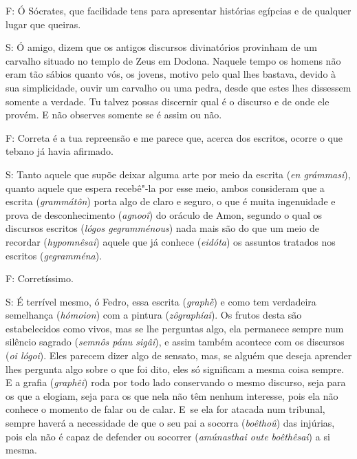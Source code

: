 F: Ó Sócrates, que facilidade tens para apresentar histórias egípcias e
de qualquer lugar que queiras.

 

S: Ó amigo, dizem que os antigos discursos divinatórios provinham de um
carvalho situado no templo de Zeus em Dodona. Naquele tempo os homens
não eram tão sábios quanto vós, os jovens, motivo pelo qual lhes
bastava, devido à sua simplicidade, ouvir um carvalho ou uma pedra,
desde que estes lhes dissessem somente a verdade. \bekker{[275c]} Tu talvez
possas discernir qual é o discurso e de onde ele provém. E não observes
somente se é assim ou não.

F: Correta é a tua repreensão e me parece que, acerca dos escritos,
ocorre o que tebano já havia afirmado.

 

S: Tanto aquele que supõe deixar alguma arte por meio da escrita
(\emph{en grámmasi}), quanto aquele que espera recebê"-la por esse meio,
ambos consideram que a escrita (\emph{grammátôn}) porta algo de claro e
seguro, o que é muita ingenuidade e prova de desconhecimento
(\emph{agnooî}) do oráculo de Amon, \bekker{[275d]} segundo o qual os
discursos escritos (\emph{lógos gegramménous}) nada mais são do que um
meio de recordar (\emph{hypomnêsai}) aquele que já conhece
(\emph{eidóta}) os assuntos tratados nos escritos
(\emph{gegramména}).

F: Corretíssimo.

 

S: É terrível mesmo, ó Fedro, essa escrita (\emph{graphḕ}) e como tem
verdadeira semelhança (\emph{hómoion}) com a pintura
(\emph{zôgraphíai}). Os frutos desta são estabelecidos como vivos, mas
se lhe perguntas algo, ela permanece sempre num silêncio sagrado
(\emph{semnôs pánu sigâi}), e assim também acontece com os discursos
(\emph{oi lógoi}). Eles parecem dizer algo de sensato, mas, se alguém
que deseja aprender lhes pergunta algo sobre o que foi dito, eles só
significam a mesma coisa sempre. \bekker{[275e]} E a grafia (\emph{graphêi})
roda por todo lado conservando o mesmo discurso, seja para os que a
elogiam, seja para os que nela não têm nenhum interesse, pois ela não
conhece o momento de falar ou de calar. E~se ela for atacada num
tribunal, sempre haverá a necessidade de que o seu pai a socorra
(\emph{boêthoû}) das injúrias, pois ela não é capaz de defender ou
socorrer (\emph{amúnasthai oute boêthêsai}) a si mesma.

